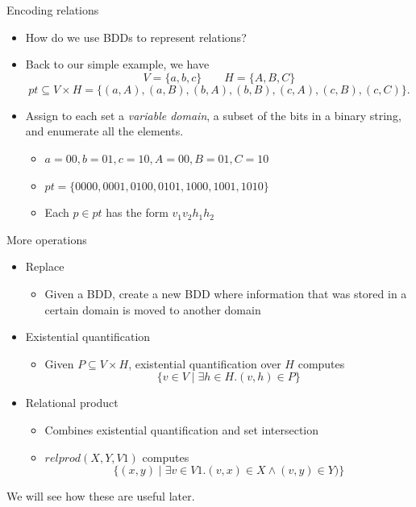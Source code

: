 \documentclass{beamer}
\begin{document}
\begin{frame}{Encoding relations}
\begin{itemize}
\item How do we use BDDs to represent relations? 
\item Back to our simple example, we have 
$$V = \{a, b, c\} \qquad H = \{A, B, C\}$$ 
$$pt \subseteq V \times H = \{(a, A), (a, B), (b, A), (b, B), (c, A), (c, B), (c, C)\}.$$
\item Assign to each set a \emph{variable domain}, a subset of the bits in a
binary string, and enumerate all the elements.
\begin{itemize}
    \item $a = 00, b = 01, c = 10, A = 00, B = 01, C = 10$
    \item $pt = \{0000, 0001, 0100, 0101, 1000, 1001, 1010\}$
    \item Each $p \in pt$ has the form $v_1v_2h_1h_2$
\end{itemize}
\end{itemize}
\end{frame}

\begin{frame}{More operations}
\begin{itemize}
\item Replace
  \begin{itemize}
    \item Given a BDD, create a new BDD where information that was stored
    in a certain domain is moved to another domain
  \end{itemize}
\item Existential quantification
  \begin{itemize}
    \item Given $P \subseteq V \times H$, existential quantification over $H$ computes
    $$ \{ v \in V \mid \exists h \in H. (v, h) \in P \} $$
    \end{itemize}
\item Relational product
  \begin{itemize}
    \item Combines existential quantification and set intersection
    \item $relprod(X, Y, V1)$ computes
    $$\{(x, y) \mid \exists v \in V1 . (v, x) \in X \wedge (v, y) \in Y)\}$$
  \end{itemize}
\end{itemize}
We will see how these are useful later.
\end{frame}
\end{document}
